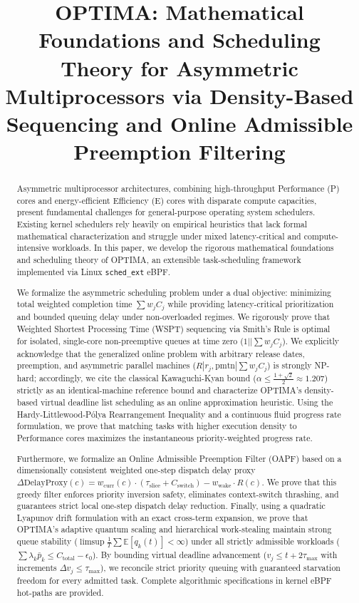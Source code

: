 \documentclass[conference]{IEEEtran}
\title{OPTIMA: Mathematical Foundations and Scheduling Theory for Asymmetric Multiprocessors via Density-Based Sequencing and Online Admissible Preemption Filtering}
\author{\IEEEauthorblockN{Risheendra MN}
\IEEEauthorblockA{\textit{Systems Research} \\
rishindra.hackbox@gmail.com}
}
\begin{document}
\maketitle

\begin{abstract}
Asymmetric multiprocessor architectures, combining high-throughput Performance (P) cores and energy-efficient Efficiency (E) cores with disparate compute capacities, present fundamental challenges for general-purpose operating system schedulers. Existing kernel schedulers rely heavily on empirical heuristics that lack formal mathematical characterization and struggle under mixed latency-critical and compute-intensive workloads. In this paper, we develop the rigorous mathematical foundations and scheduling theory of OPTIMA, an extensible task-scheduling framework implemented via Linux \texttt{sched\_ext} eBPF. 

We formalize the asymmetric scheduling problem under a dual objective: minimizing total weighted completion time $\sum w_j C_j$ while providing latency-critical prioritization and bounded queuing delay under non-overloaded regimes. We rigorously prove that Weighted Shortest Processing Time (WSPT) sequencing via Smith's Rule is optimal for isolated, single-core non-preemptive queues at time zero ($1 || \sum w_j C_j$). We explicitly acknowledge that the generalized online problem with arbitrary release dates, preemption, and asymmetric parallel machines ($R | r_j, \text{pmtn} | \sum w_j C_j$) is strongly NP-hard; accordingly, we cite the classical Kawaguchi-Kyan bound ($\alpha \le \frac{1+\sqrt{2}}{2} \approx 1.207$) strictly as an identical-machine reference bound and characterize OPTIMA's density-based virtual deadline list scheduling as an online approximation heuristic. Using the Hardy-Littlewood-P\'olya Rearrangement Inequality and a continuous fluid progress rate formulation, we prove that matching tasks with higher execution density to Performance cores maximizes the instantaneous priority-weighted progress rate.

Furthermore, we formalize an Online Admissible Preemption Filter (OAPF) based on a dimensionally consistent weighted one-step dispatch delay proxy $\Delta\mathrm{DelayProxy}(c) = w_{\mathrm{curr}}(c) \cdot (\tau_{\mathrm{slice}} + C_{\mathrm{switch}}) - w_{\mathrm{wake}} \cdot R(c)$. We prove that this greedy filter enforces priority inversion safety, eliminates context-switch thrashing, and guarantees strict local one-step dispatch delay reduction. Finally, using a quadratic Lyapunov drift formulation with an exact cross-term expansion, we prove that OPTIMA's adaptive quantum scaling and hierarchical work-stealing maintain strong queue stability ($\limsup \frac{1}{T} \sum \mathbb{E}[q_k(t)] < \infty$) under all strictly admissible workloads ($\sum \lambda_k \bar{p}_k \le C_{\text{total}} - \epsilon_0$). By bounding virtual deadline advancement ($v_j \le t + 2 \tau_{\max}$ with increments $\Delta v_j \le \tau_{\max}$), we reconcile strict priority queuing with guaranteed starvation freedom for every admitted task. Complete algorithmic specifications in kernel eBPF hot-paths are provided.
\end{abstract}
\end{document}
